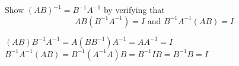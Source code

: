 
\begin{Exercise}[
name={},
title={}, 
difficulty=0,
origin={\cite{KK}}]
Show $\left( AB\right) ^{-1}=B^{-1}A^{-1}$ by verifying that 
\begin{equation*}
AB\left(
B^{-1}A^{-1}\right) =I\text{ and }B^{-1}A^{-1}\left( AB\right) =I
\end{equation*}
\end{Exercise}

\begin{Answer}
$\left( AB\right)
B^{-1}A^{-1}=A\left( BB^{-1}\right) A^{-1}=AA^{-1}=I$ 
$B^{-1}A^{-1}\left(
AB\right) =B^{-1}\left( A^{-1}A\right) B=B^{-1}IB=B^{-1}B=I$
\end{Answer}
